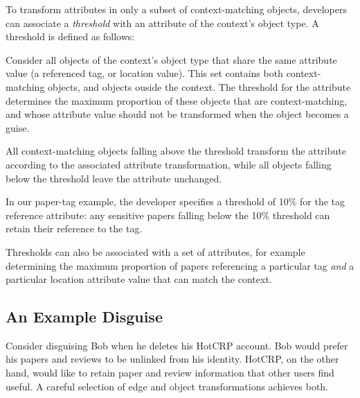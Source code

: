 To transform attributes in only a subset of context-matching objects, developers can associate a
\emph{threshold} with an attribute of the context's object type.  A threshold is defined as follows:

Consider all objects of the context's object type that share the same attribute value (\eg a
referenced tag, or location value). This set contains both context-matching objects, and objects
ouside the context. The threshold for the attribute determines the maximum proportion of these
objects that are context-matching, and whose attribute value should not be transformed when the
object becomes a guise.

All context-matching objects falling above the threshold transform the attribute according to the
associated attribute transformation, while all objects falling below the threshold leave the
attribute unchanged. 

In our paper-tag example, the developer specifies a threshold of 10\% for the tag reference
attribute: any sensitive papers falling below the 10\% threshold can retain their reference to the tag.

Thresholds can also be associated with a set of
attributes, for example determining the maximum proportion of papers referencing a particular tag
\emph{and} a particular location attribute value that can match the context.



\iffalse
\subsection{An Example Disguise}
\label{design:eg}
%
Consider disguising Bob when he deletes his HotCRP account.
%
Bob would prefer his papers and reviews to be unlinked from his identity.
%
HotCRP, on the other hand, would like to retain paper and review information that other users
find useful.
%
A careful selection of edge and object transformations achieves both.
%

